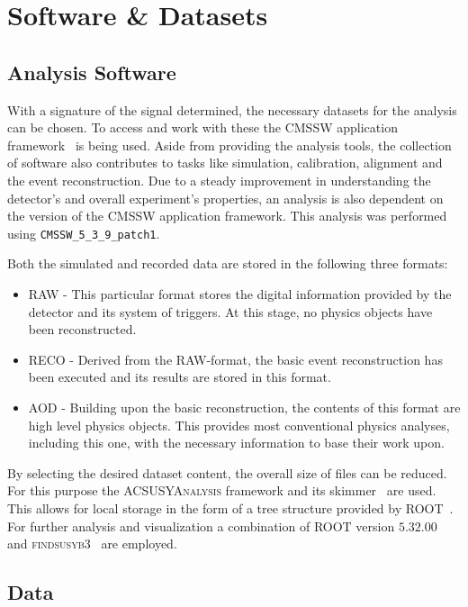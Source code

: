 \chapter{Software \& Datasets}
\label{cha:datasets}

\section{Analysis Software}

With a signature of the signal determined, the necessary datasets for the analysis can be chosen. To access and work with these the \textsc{CMSSW} application framework~\cite{cmssw} is being used. Aside from providing the analysis tools, the collection of software also contributes to tasks like simulation, calibration, alignment and the event reconstruction. Due to a steady improvement in understanding the detector's and overall experiment's properties, an analysis is also dependent on the version of the \textsc{CMSSW} application framework. This analysis was performed using \verb+CMSSW_5_3_9_patch1+.

Both the simulated and recorded data are stored in the following three formats:

\begin{itemize}
\item \textsc{RAW} - This particular format stores the digital information provided by the detector and its system of triggers. At this stage, no physics objects have been reconstructed.
\item \textsc{RECO} - Derived from the \textsc{RAW}-format, the basic event reconstruction has been executed and its results are stored in this format.
\item \textsc{AOD} - Building upon the basic reconstruction, the contents of this format are high level physics objects. This provides most conventional physics analyses, including this one, with the necessary information to base their work upon.
\end{itemize}

By selecting the desired dataset content, the overall size of files can be reduced. For this purpose the \textsc{ACSUSYAnalysis} framework and its skimmer~\cite{acsusyana} are used. This allows for local storage in the form of a tree structure provided by \textsc{ROOT}~\cite{root}. For further analysis and visualization a combination of \textsc{ROOT} version $5.32.00$ and \textsc{findsusyb3}~\cite{findsusyb3} are employed. 


\section{Data}

